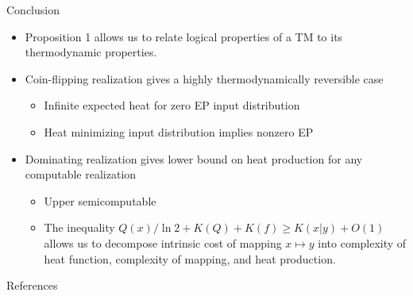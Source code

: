 \documentclass{beamer}
\begin{document}
\begin{frame}{Conclusion}

\begin{itemize}
    \item Proposition 1 allows us to relate logical properties of a TM to its thermodynamic properties.
    \item Coin-flipping realization gives a highly thermodynamically reversible case
    \begin{itemize}
        \item Infinite expected heat for zero EP input distribution
        \item Heat minimizing input distribution implies nonzero EP
    \end{itemize}
    \item Dominating realization gives lower bound on heat production for any computable realization
    \begin{itemize}
        \item Upper semicomputable
        \item The inequality $ Q(x)/\ln 2 + K(Q) + K(f) \ge K(x|y) + O(1)$ allows us to decompose intrinsic cost of mapping $x\mapsto y$ into complexity of heat function, complexity of mapping, and heat production.
    \end{itemize}
\end{itemize}

\end{frame}

\begin{frame}{References}
    \printbibliography
\end{frame}
\end{document}
